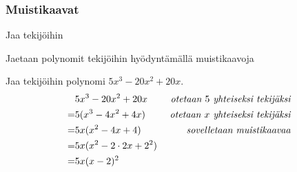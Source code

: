 \subsubsection*{Muistikaavat}

\begin{esimerkki}
Jaa tekijöihin
	\begin{esimratk}
Jaetaan polynomit tekijöihin hyödyntämällä muistikaavoja
	\end{esimratk}
\end{esimerkki}

\begin{esimerkki}
Jaa tekijöihin polynomi $5x^3-20x^2+20x$.
\begin{align*}
& 5x^3-20x^2+20x \ \ \ \ &\emph{otetaan $5$ yhteiseksi tekijäksi}\\
=& 5(x^3-4x^2+4x)&\emph{otetaan $x$ yhteiseksi tekijäksi}  \\
=& 5x(x^2-4x+4) &\emph{sovelletaan muistikaavaa} \\
=& 5x(x^2-2\cdot 2x+2^2)  \\
=& 5x(x-2)^2
\end{align*}
\end{esimerkki}


